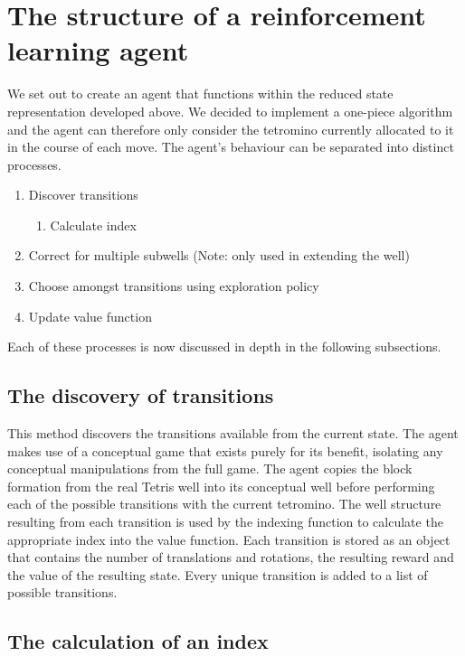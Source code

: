 \documentclass{rucsthesis}
\begin{document}
\section{The structure of a reinforcement learning agent }

We set out to create an agent that functions within the reduced state representation developed above. We decided to implement a one-piece algorithm and the agent can therefore only consider the tetromino currently allocated to it in the course of each move. The agent's behaviour can be separated into distinct processes.

\begin{enumerate}
\item{Discover transitions}
\begin{enumerate}
\item{Calculate index}
\end{enumerate}
\item{Correct for multiple subwells (Note: only used in extending the well) }
\item{Choose amongst transitions using exploration policy}
\item{Update value function}
\end{enumerate}

Each of these processes is now discussed in depth in the following subsections. 

\subsection{The discovery of transitions}

This method discovers the transitions available from the current state. The agent makes use of a conceptual game that exists purely for its benefit, isolating any conceptual manipulations from the full game. The agent copies the block formation from the real Tetris well into its conceptual well before performing each of the possible transitions with the current tetromino. The well structure resulting from each transition is used by the indexing function to calculate the appropriate index into the value function. Each transition is stored as an object that contains the number of translations and rotations, the resulting reward and the value of the resulting state.  Every unique transition is added to a list of possible transitions.

\subsection{The calculation of an index}
\end{document}
